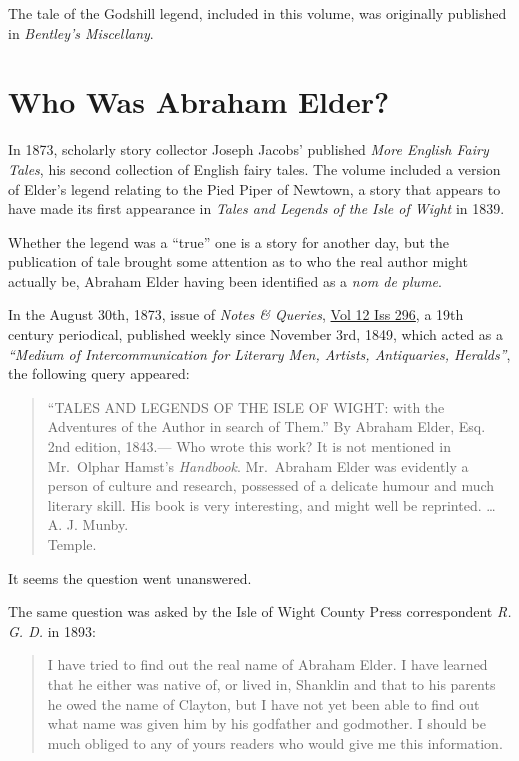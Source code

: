 \documentclass[
  12pt,
  a5paper,
  twoside]{book}
\begin{document}
The tale of the Godshill legend, included in this volume, was originally
published in \emph{Bentley's Miscellany}.

\section{Who Was Abraham Elder?}\label{who-was-abraham-elder}

In 1873, scholarly story collector Joseph Jacobs' published \emph{More
English Fairy Tales}, his second collection of English fairy tales. The
volume included a version of Elder's legend relating to the Pied Piper
of Newtown, a story that appears to have made its first appearance in
\emph{Tales and Legends of the Isle of Wight} in 1839.

Whether the legend was a ``true'' one is a story for another day, but
the publication of tale brought some attention as to who the real author
might actually be, Abraham Elder having been identified as a \emph{nom
de plume}.

In the August 30th, 1873, issue of \emph{Notes \& Queries},
\href{https://archive.org/details/sim_notes-and-queries_1873-08-30_12_296/page/168/mode/2up}{Vol
12 Iss 296}, a 19th century periodical, published weekly since November
3rd, 1849, which acted as a \emph{``Medium of Intercommunication for
Literary Men, Artists, Antiquaries, Heralds''}, the following query
appeared:

\begin{quote}
``TALES AND LEGENDS OF THE ISLE OF WIGHT: with the Adventures of the
Author in search of Them.'' By Abraham Elder, Esq. 2nd edition, 1843.---
Who wrote this work? It is not mentioned in Mr.~Olphar Hamst's
\emph{Handbook}. Mr.~Abraham Elder was evidently a person of culture and
research, possessed of a delicate humour and much literary skill. His
book is very interesting, and might well be reprinted. \ldots{} A. J.
Munby.\\
Temple.
\end{quote}

It seems the question went unanswered.

The same question was asked by the Isle of Wight County Press
correspondent \emph{R. G. D.} in 1893:

\begin{quote}
I have tried to find out the real name of Abraham Elder. I have learned
that he either was native of, or lived in, Shanklin and that to his
parents he owed the name of Clayton, but I have not yet been able to
find out what name was given him by his godfather and godmother. I
should be much obliged to any of yours readers who would give me this
information.
\end{quote}
\end{document}
